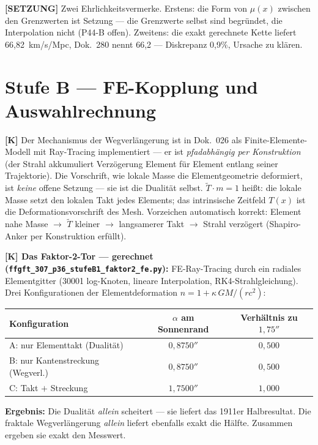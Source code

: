 \documentclass[11pt]{report}
\begin{document}
\medskip
\textbf{[SETZUNG]} Zwei Ehrlichkeitsvermerke.
Erstens: die Form von $\mu(x)$ zwischen den Grenzwerten ist Setzung
— die Grenzwerte selbst sind begründet, die Interpolation nicht
(P44-B offen).
Zweitens: die exakt gerechnete Kette liefert 66{,}82~km/s/Mpc,
Dok.~280 nennt 66{,}2 — Diskrepanz 0{,}9\%, Ursache zu klären.

\section{Stufe B — FE-Kopplung und Auswahlrechnung}

\textbf{[K]} Der Mechanismus der Wegverlängerung ist in Dok.~026 als
Finite-Elemente-Modell mit Ray-Tracing implementiert — er ist
\emph{pfadabhängig per Konstruktion} (der Strahl akkumuliert
Verzögerung Element für Element entlang seiner Trajektorie).
Die Vorschrift, wie lokale Masse die Elementgeometrie
deformiert, ist \emph{keine} offene Setzung — sie ist die Dualität
selbst. $\tilde T \cdot m = 1$ heißt: die lokale Masse setzt den
lokalen Takt jedes Elements; das intrinsische Zeitfeld $T(x)$ ist
die Deformationsvorschrift des Mesh. Vorzeichen automatisch korrekt:
Element nahe Masse $\to$ $\tilde T$ kleiner $\to$ langsamerer Takt
$\to$ Strahl verzögert (Shapiro-Anker per Konstruktion erfüllt).

\medskip
\textbf{[K] Das Faktor-2-Tor — gerechnet (\texttt{ffgft\_307\_p36\_stufeB1\_faktor2\_fe.py}):}
FE-Ray-Tracing durch ein radiales Elementgitter (30001 log-Knoten,
lineare Interpolation, RK4-Strahlgleichung). Drei Konfigurationen der
Elementdeformation $n = 1 + \kappa\,GM/(rc^2)$:

\begin{center}
\begin{tabular}{lcc}
\toprule
Konfiguration & $\alpha$ am Sonnenrand & Verhältnis zu $1{,}75''$\\
\midrule
A: nur Elementtakt (Dualität)   & $0{,}8750''$ & $0{,}500$\\
B: nur Kantenstreckung (Wegverl.) & $0{,}8750''$ & $0{,}500$\\
C: Takt $+$ Streckung           & $1{,}7500''$ & $1{,}000$\\
\bottomrule
\end{tabular}
\end{center}

\textbf{Ergebnis:} Die Dualität \emph{allein} scheitert —
sie liefert das 1911er Halbresultat. Die fraktale Wegverlängerung
\emph{allein} liefert ebenfalls exakt die Hälfte. Zusammen ergeben
sie exakt den Messwert.
\end{document}
